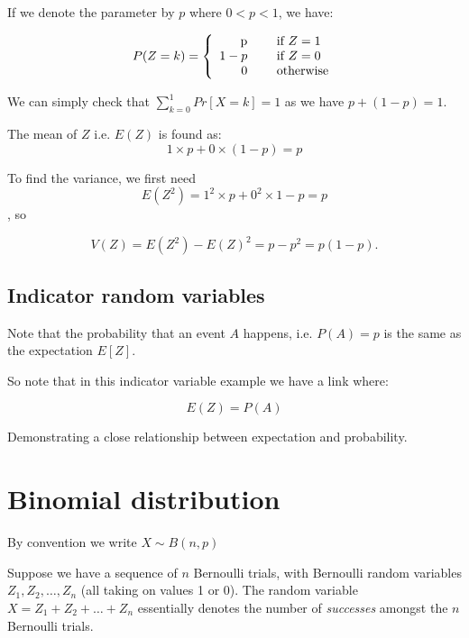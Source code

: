 \documentclass[12pt]{extbook}
\begin{document}
If we denote the parameter by $p$ where $0 < p < 1$, we have:

\begin{displaymath}
P(Z=k) = \left\{ \begin{array}{rrl} $p$ & & \mbox{ if } Z = 1\\
1-p & & \mbox{ if } Z=0 \\
0 & & \mbox{ otherwise}
\end{array} \right.
\end{displaymath}

We can simply check that $\sum_{k=0}^1 Pr[X=k] = 1$ as we have $p + (1-p)=1$.

The mean of $Z$ i.e. $E(Z)$ is found as: 
\begin{displaymath}
1 \times p + 0 \times (1-p) = p
\end{displaymath}

To find the variance, we first need 
\begin{displaymath}
E(Z^2) = 1^2 \times p + 0^2 \times 1-p = p
\end{displaymath}, so 

\begin{displaymath}
V(Z) = E(Z^2)-E(Z)^2 = p - p^2 = p(1 - p).
\end{displaymath}


\subsection{Indicator random variables}

Note that the probability that an event $A$ happens, i.e. $P(A)=p$ is the same as the expectation $E[Z]$.

So note that in this indicator variable example we have a link where:

\begin{displaymath}
E(Z) = P(A)
\end{displaymath}

Demonstrating a close relationship between expectation and probability.

\section{Binomial distribution}

{\color{green}By convention we write $X \sim B(n, p)$}


Suppose we have a sequence of $n$ Bernoulli trials, with Bernoulli
random variables $Z_1, Z_2, \ldots, Z_n$ (all taking on values 1 or
0).   The random variable $X=Z_1 + Z_2 + \ldots + Z_n$ essentially
denotes the number of \emph{successes} amongst the $n$ Bernoulli
trials.
\end{document}
